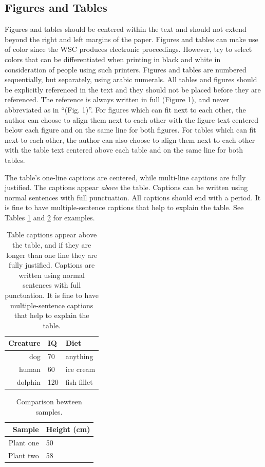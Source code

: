 \documentclass{wscpaperproc}
\theoremstyle{wsc}
\begin{document}
\subsection{Figures and Tables}
\label{sec:graphics}
Figures and tables should be centered within the text and should not extend beyond the right and left margins of the paper.
Figures and tables can make use of color since the WSC produces electronic proceedings.
However, try to select colors that can be differentiated when printing in black and white in consideration of people using such printers. Figures and tables are numbered sequentially, but separately, using arabic numerals. 
All tables and figures should be explicitly referenced in the text and they should not be placed before they are referenced. 
The reference is always written in full (Figure 1), and never abbreviated as in ``(Fig. 1)''.
For figures which can fit next to each other, the author can choose to align them next to each other with the figure text centered below each figure and on the same line for both figures. For tables which can fit next to each other, the author can also choose to align them next to each other with the table text centered above each table and on the same line for both tables. 

The table's one-line captions are centered, while multi-line captions are fully justified.
The captions appear {\em above} the table. 
Captions can be written using normal sentences with full punctuation. All captions should end with a period. It is fine to have multiple-sentence captions that help to explain the table. 
See Tables \ref{tab: first} and \ref{tab: second} for examples.

\begin{table}[htb]
\centering
\caption{Table captions appear above the table, and if they are longer than one line they are fully justified. Captions are written using normal sentences with full punctuation. It is fine to have multiple-sentence captions that help to explain the table.\label{tab: first}}
\begin{tabular}{rll}
\hline
Creature & IQ & Diet\\ \hline
dog & 70 & anything\\
human & 60 & ice cream \\
dolphin & 120 & fish fillet\\
\hline
\end{tabular}
\end{table}

\begin{table}[htb]
\centering
\caption{Comparison bewteen samples.\label{tab: second}}
\begin{tabular}{|r|l|}
\hline
Sample & Height (cm) \\ \hline
Plant one & 50 \\ \hline
Plant two & 58 \\
\hline
\end{tabular}
\end{table}
 
\end{document}
